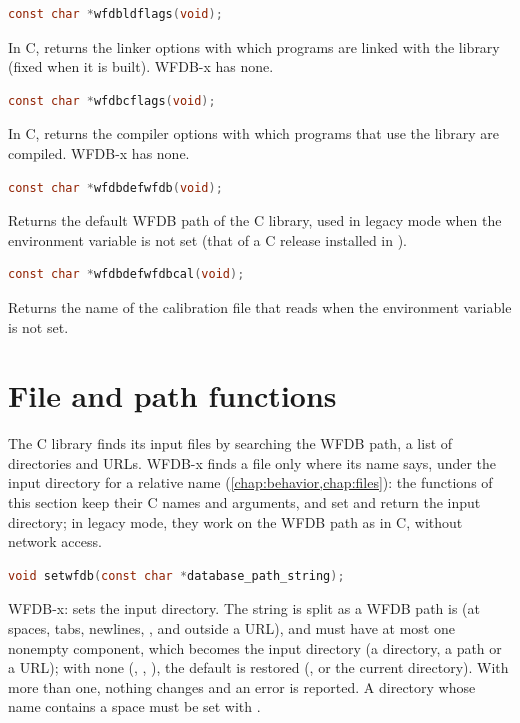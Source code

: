 \begin{lstlisting}[language=C,style=signature]
const char *wfdbldflags(void);
\end{lstlisting}
In C, returns the linker options with which programs are linked with the
library (fixed when it is built). WFDB-x has none.

\begin{lstlisting}[language=C,style=signature]
const char *wfdbcflags(void);
\end{lstlisting}
In C, returns the compiler options with which programs that use the library
are compiled. WFDB-x has none.

\begin{lstlisting}[language=C,style=signature]
const char *wfdbdefwfdb(void);
\end{lstlisting}
Returns the default WFDB path of the C library, used in legacy mode when the
environment variable  is not set (that of a C release installed in
).

\begin{lstlisting}[language=C,style=signature]
const char *wfdbdefwfdbcal(void);
\end{lstlisting}
Returns the name of the calibration file that  reads when
the environment variable  is not set.

\section{File and path functions}
\label{sec:library-files}

The C library finds its input files by searching the WFDB path, a list of
directories and URLs. WFDB-x finds a file only where its name says, under the
input directory for a relative name (\cref{chap:behavior,chap:files}): the
functions of this section keep their C names and arguments, and set and
return the input directory; in legacy mode, they work on the WFDB path as in
C, without network access.

\begin{lstlisting}[language=C,style=signature]
void setwfdb(const char *database_path_string);
\end{lstlisting}
WFDB-x: sets the input directory. The string is split as a WFDB path is (at
spaces, tabs, newlines, \code{;}, and \code{:} outside a URL), and must have at
most one nonempty component, which becomes the input directory (a directory,
a \code{\textasciitilde} path or a URL); with none (, ,
), the default is restored (, or the
current directory). With more than one, nothing changes and an error is
reported. A directory whose name contains a space must be set with
.

